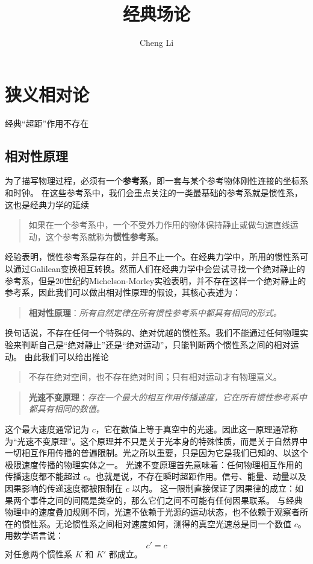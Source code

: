 \documentclass[a4paper]{report}
\author{Cheng Li}
\title{\textbf{{\Huge 经典场论}}}
\begin{document}
\maketitle
\tableofcontents


\chapter{狭义相对论}
经典“超距”作用不存在
\section{相对性原理}


为了描写物理过程，必须有一个\textbf{参考系}，即一套与某个参考物体刚性连接的坐标系和时钟。
在这些参考系中，我们会重点关注的一类最基础的参考系就是惯性系，这也是经典力学的延续
\begin{quote}
如果在一个参考系中，一个不受外力作用的物体保持静止或做匀速直线运动，这个参考系就称为\textbf{惯性参考系}。
\end{quote}
经验表明，惯性参考系是存在的，并且不止一个。在经典力学中，所用的惯性系可以通过Galilean变换相互转换。然而人们在经典力学中会尝试寻找一个绝对静止的参考系，但是20世纪的Michelson-Morley实验表明，并不存在这样一个绝对静止的参考系，因此我们可以做出相对性原理的假设，其核心表述为：
\begin{quote}
\textbf{相对性原理}：\textit{所有自然定律在所有惯性参考系中都具有相同的形式。}
\end{quote}
换句话说，不存在任何一个特殊的、绝对优越的惯性系。我们不能通过任何物理实验来判断自己是“绝对静止”还是“绝对运动”，只能判断两个惯性系之间的相对运动。
由此我们可以给出推论
\begin{quote}
不存在绝对空间，也不存在绝对时间；只有相对运动才有物理意义。
\end{quote}

\begin{quote}
\textbf{光速不变原理}：\textit{存在一个最大的相互作用传播速度，它在所有惯性参考系中都具有相同的数值。}
\end{quote}

这个最大速度通常记为 \(c\)，它在数值上等于真空中的光速。因此这一原理通常称为“光速不变原理”。这个原理并不只是关于光本身的特殊性质，而是关于自然界中一切相互作用传播的普遍限制。光之所以重要，只是因为它是我们已知的、以这个极限速度传播的物理实体之一。
光速不变原理首先意味着：任何物理相互作用的传播速度都不能超过 \(c\)。也就是说，不存在瞬时超距作用。信号、能量、动量以及因果影响的传递速度都被限制在 \(c\) 以内。
这一限制直接保证了因果律的成立：如果两个事件之间的间隔是类空的，那么它们之间不可能有任何因果联系。
与经典物理中的速度叠加规则不同，光速不依赖于光源的运动状态，也不依赖于观察者所在的惯性系。无论惯性系之间相对速度如何，测得的真空光速总是同一个数值 \(c\)。
用数学语言说：
\[
c' = c
\]
对任意两个惯性系 \(K\) 和 \(K'\) 都成立。
\end{document}
